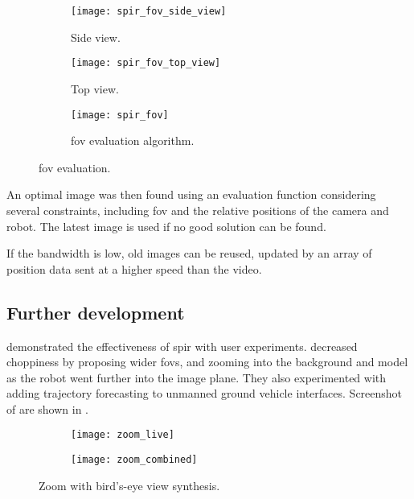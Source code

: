   \begin{figure}[h]
    \centering
    \begin{subfigure}[b]{0.3\textwidth}
      \texttt{[image: spir\_fov\_side\_view]}
      \caption{Side view.}
      \label{fig:spir_fov_side_view}
    \end{subfigure}
    \hfill
    \begin{subfigure}[b]{0.3\textwidth}
      \texttt{[image: spir\_fov\_top\_view]}
      \caption{Top view.}
      \label{fig:spir_fov_top_view}
    \end{subfigure}
    \hfill
    \begin{subfigure}[b]{0.3\textwidth}
      \texttt{[image: spir\_fov]}
      \caption{\Gls{fov} evaluation algorithm.}
      \label{fig:spir_fov_flowchart}
    \end{subfigure}
    \caption[\acrshort{spir} \gls{fov} evaluation algorithm]{\Gls{fov} evaluation.\cite{shiroma2004}}
    \label{fig:spir_fov}
  \end{figure}

  An optimal image was then found using an evaluation function considering several constraints, including \gls{fov} and the relative positions of the camera and robot.
  The latest image is used if no good solution can be found.

  If the bandwidth is low, old images can be reused, updated by an array of position data sent at a higher speed than the video.

  \subsection{Further development}
    \textcite{sugimoto2005} demonstrated the effectiveness of \gls{spir} with user experiments.
    \textcite{ito2008} decreased choppiness by proposing wider \glspl{fov}, and zooming into the background and model as the robot went further into the image plane.
    They also experimented with adding trajectory forecasting to unmanned ground vehicle interfaces.
    Screenshot of \textcite{ito2008} are shown in .

    \begin{figure}[h]
      \centering
      \begin{subfigure}[b]{0.45\textwidth}
	\texttt{[image: zoom\_live]}
      \end{subfigure}
      \hfill
      \begin{subfigure}[b]{0.45\textwidth}
	\texttt{[image: zoom\_combined]}
      \end{subfigure}
      \caption[\acrshort{spir} with zoom]{Zoom with bird's-eye view synthesis.\cite{ito2008}}
      \label{fig:zoom_results}
    \end{figure}

